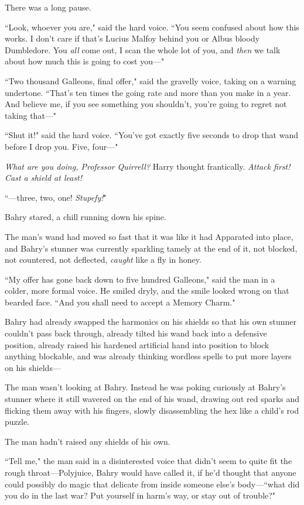 There was a long pause.

``Look, whoever you are," said the hard voice. ``You seem confused about how this works. I don't care if that's Lucius Malfoy behind you or Albus bloody Dumbledore. You \emph{all} come out, I scan the whole lot of you, and \emph{then} we talk about how much this is going to cost you—"

``Two thousand Galleons, final offer," said the gravelly voice, taking on a warning undertone. ``That's ten times the going rate and more than you make in a year. And believe me, if you see something you shouldn't, you're going to regret not taking that—"

``Shut it!" said the hard voice. ``You've got exactly five seconds to drop that wand before I drop you. Five, four—"

\emph{What are you doing, Professor Quirrell?} Harry thought frantically. \emph{Attack first! Cast a shield at least!}

``—three, two, one! \emph{Stupefy!}"

\later

Bahry stared, a chill running down his spine.

The man's wand had moved so fast that it was like it had Apparated into place, and Bahry's stunner was currently sparkling tamely at the end of it, not blocked, not countered, not deflected, \emph{caught} like a fly in honey.

``My offer has gone back down to five hundred Galleons," said the man in a colder, more formal voice. He smiled dryly, and the smile looked wrong on that bearded face. ``And you shall need to accept a Memory Charm."

Bahry had already swapped the harmonics on his shields so that his own stunner couldn't pass back through, already tilted his wand back into a defensive position, already raised his hardened artificial hand into position to block anything blockable, and was already thinking wordless spells to put more layers on his shields—

The man wasn't looking at Bahry. Instead he was poking curiously at Bahry's stunner where it still wavered on the end of his wand, drawing out red sparks and flicking them away with his fingers, slowly disassembling the hex like a child's rod puzzle.

The man hadn't raised any shields of his own.

``Tell me," the man said in a disinterested voice that didn't seem to quite fit the rough throat—Polyjuice, Bahry would have called it, if he'd thought that anyone could possibly do magic that delicate from inside someone else's body—``what did you do in the last war? Put yourself in harm's way, or stay out of trouble?"

